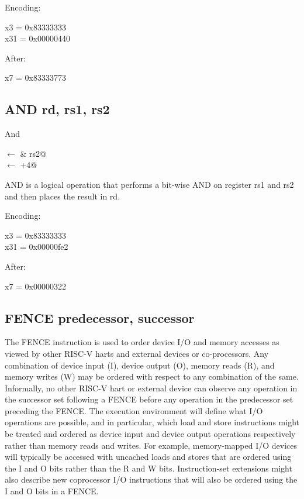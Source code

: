 Encoding:


x3  = 0x83333333\\
x31 = 0x00000440

After:

x7 = 0x83333773

\subsection{AND rd, rs1, rs2}

And

\verb@rd@ $\leftarrow$  & rs2@\\
\verb@pc@ $\leftarrow$ \verb@pc+4@

AND is a logical operation that performs a bit-wise AND on 
register rs1 and rs2 and then places the result 
in rd.~\cite[p.~14]{rvismv1v22:2017}

Encoding:


x3  = 0x83333333\\
x31 = 0x00000fe2

After:

x7 = 0x00000322

\subsection{FENCE predecessor, successor}

%
The FENCE instruction is used to order device I/O and memory accesses as 
viewed by other RISC-V harts and external devices or co-processors. Any 
combination of device input (I), device output (O), memory reads (R), 
and memory writes (W) may be ordered with respect to any combination
of the same. Informally, no other RISC-V hart or external device can 
observe any operation in the successor set following a FENCE before any 
operation in the predecessor set preceding the FENCE. The execution 
environment will define what I/O operations are possible, and in particular, 
which load and store instructions might be treated and ordered as device 
input and device output operations respectively rather than memory reads 
and writes. For example, memory-mapped I/O devices will typically be 
accessed with uncached loads and stores that are ordered using the I and O
 bits rather than the R and W bits. Instruction-set extensions might 
also describe new coprocessor I/O instructions that will also be ordered 
using the I and O bits in a FENCE.~\cite[p.~21]{rvismv1v22:2017}

